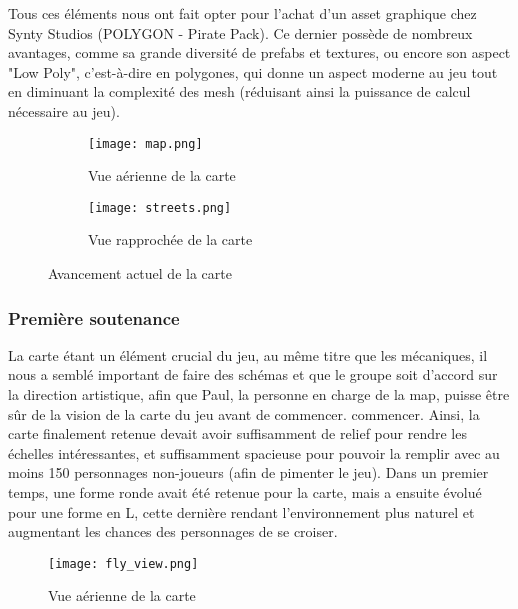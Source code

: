         Tous ces éléments nous ont fait opter pour l'achat d'un asset graphique chez 
        Synty Studios (POLYGON - Pirate Pack).
        Ce dernier possède de nombreux avantages, comme sa grande diversité de prefabs et 
        textures, ou encore son aspect "Low Poly", 
        c'est-à-dire en polygones, qui donne un aspect moderne au jeu tout en diminuant la 
        complexité des mesh (réduisant ainsi la 
        puissance de calcul nécessaire au jeu).
        \\ 

        \begin{figure}[hbt!]
            
            \begin{subfigure}[b]{1\textwidth}
                \center
                \texttt{[image: map.png]} 
                \caption{Vue aérienne de la carte}
            \end{subfigure}
            \vfill{}
            \begin{subfigure}[b]{1\textwidth}
                \center
                \texttt{[image: streets.png]} 
                \caption{Vue rapprochée de la carte}
            \end{subfigure}
            \caption{Avancement actuel de la carte}
        \end{figure}
        \FloatBarrier



\subsubsection{Première soutenance}

    La carte étant un élément crucial du jeu, au même titre que les mécaniques, 
    il nous a semblé important de faire des schémas et que le groupe soit d'accord sur la direction artistique,
    afin que Paul, la personne en charge de la map, puisse être sûr de la vision de la carte du jeu avant de commencer.
    commencer. Ainsi, la carte finalement retenue devait avoir suffisamment de 
    relief pour rendre les échelles intéressantes, et suffisamment spacieuse pour 
    pouvoir la remplir avec au moins 150 personnages non-joueurs (afin de pimenter le jeu).
    Dans un premier temps, une forme ronde avait été retenue pour la carte, mais 
    a ensuite évolué pour une forme en L, cette dernière rendant l’environnement 
    plus naturel et augmentant les chances des personnages de se croiser.


    \begin{figure}[hbt!]
        \centering
        \texttt{[image: fly\_view.png]}
        \caption{Vue aérienne de la carte}
    \end{figure}
    \FloatBarrier

